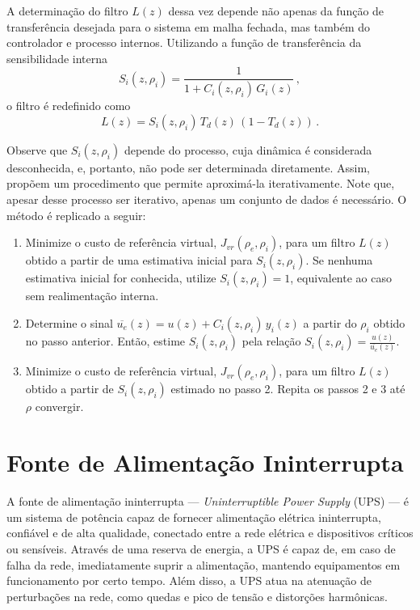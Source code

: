 \documentclass[repeatfields,oneside,overleaf]{tcc}
\newcommand{\mycdot}{ \, }
\newcommand{\myC}[2][]{ C_{#1} \left( #2 \right) }
\newcommand{\myG}[2][]{ G_{#1} \left( #2 \right) }
\newcommand{\myCzrho}[1]{ \myC[#1]{z, \rho_{#1}} }
\begin{document}
A determinação do filtro $L(z)$ dessa vez depende não apenas da função de transferência desejada para o sistema em malha fechada, mas também do controlador e processo internos.
Utilizando a função de transferência da sensibilidade interna
\begin{equation}\label{eq:VRFT_cascade1_S}
    S_i(z, \rho_i) = \dfrac{ 1 }{ 1 + \myCzrho{i} \mycdot \myG[i]{z} }
    \,,
\end{equation}
o filtro é redefinido como
\begin{equation}\label{eq:VRFT_cascade1_L}
    L(z) = S_i(z, \rho_i) \mycdot T_d(z) \mycdot \left( 1 - T_d(z) \right)
    \,.
\end{equation}

Observe que $S_i(z, \rho_i)$ depende do processo, cuja dinâmica é considerada desconhecida, e, portanto, não pode ser determinada diretamente.
Assim, \textcite{Chrystian2020} propõem um procedimento que permite aproximá-la iterativamente.
Note que, apesar desse processo ser iterativo, apenas um conjunto de dados é necessário.
O método é replicado a seguir:
\begin{enumerate}
    \item Minimize o custo de referência virtual, $J_{vr} \left( \rho_e, \rho_i \right)$, para um filtro $L(z)$ obtido a partir de uma estimativa inicial para $S_i(z, \rho_i)$. Se nenhuma estimativa inicial for conhecida, utilize  $S_i(z, \rho_i) = 1$, equivalente ao caso sem realimentação interna.
    \item Determine o sinal $\overline{u_e}(z) = u(z) + \myCzrho{i} \mycdot y_i(z)$ a partir do $\rho_i$ obtido no passo anterior. Então, estime $S_i(z, \rho_i)$ pela relação $S_i(z, \rho_i) = \frac{u(z)}{\overline{u_e}(z)}$.
    \item Minimize o custo de referência virtual, $J_{vr} \left( \rho_e, \rho_i \right)$, para um filtro $L(z)$ obtido a partir de $S_i(z, \rho_i)$ estimado no passo 2. Repita os passos 2 e 3 até $\rho$ convergir.
\end{enumerate}

\newpage
\section{Fonte de Alimentação Ininterrupta}\label{sec:UPS}


A fonte de alimentação ininterrupta --- \textit{Uninterruptible Power Supply} (UPS) --- é um sistema de potência capaz de fornecer alimentação elétrica ininterrupta, confiável e de alta qualidade, conectado entre a rede elétrica e dispositivos críticos ou sensíveis.
Através de uma reserva de energia, a UPS é capaz de, em caso de falha da rede, imediatamente suprir a alimentação, mantendo equipamentos em funcionamento por certo tempo.
Além disso, a UPS atua na atenuação de perturbações na rede, como quedas e pico de tensão e distorções harmônicas.
\end{document}
